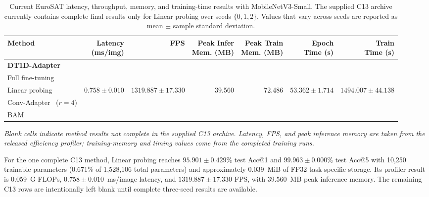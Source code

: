 \documentclass[pdflatex,sn-mathphys-num]{sn-jnl}
\theoremstyle{thmstyleone}
\theoremstyle{thmstyletwo}
\theoremstyle{thmstylethree}
\begin{document}
\begin{table}[!htbp]
\centering
\caption{Current EuroSAT latency, throughput, memory, and training-time results with MobileNetV3-Small. The supplied C13 archive currently contains complete final results only for Linear probing over seeds $\{0,1,2\}$. Values that vary across seeds are reported as mean $\pm$ sample standard deviation.}
\label{tab:eurosat_mobilenetv3_runtime}
\scriptsize
\setlength{\tabcolsep}{3pt}
\renewcommand{\arraystretch}{1.12}
\begin{tabularx}{\linewidth}{@{}Xrrrrrr@{}}
\toprule
\textbf{Method} &
\makecell{\textbf{Latency}\\\textbf{(ms/img)}} &
\textbf{FPS} &
\makecell{\textbf{Peak Infer}\\\textbf{Mem. (MB)}} &
\makecell{\textbf{Peak Train}\\\textbf{Mem. (MB)}} &
\makecell{\textbf{Epoch}\\\textbf{Time (s)}} &
\makecell{\textbf{Train}\\\textbf{Time (s)}} \\
\midrule
\textbf{DT1D-Adapter} &  &  &  &  &  & \\
Full fine-tuning &  &  &  &  &  & \\
Linear probing & $0.758\pm0.010$ & $1319.887\pm17.330$ & 39.560 & 72.486 & $53.362\pm1.714$ & $1494.007\pm44.138$ \\
Conv-Adapter~\cite{chen2024convadapter} ($r=4$) &  &  &  &  &  & \\
BAM~\cite{park2020lightweightattention} &  &  &  &  &  & \\
\bottomrule
\end{tabularx}

\vspace{2pt}
{\footnotesize\textit{Blank cells indicate method results not complete in the supplied C13 archive. Latency, FPS, and peak inference memory are taken from the released efficiency profiler; training-memory and timing values come from the completed training runs.}}
\end{table}


For the one complete C13 method, Linear probing reaches $95.901\pm0.429\%$ test Acc@1 and $99.963\pm0.000\%$ test Acc@5 with 10,250 trainable parameters (0.671\% of 1,528,106 total parameters) and approximately 0.039~MiB of FP32 task-specific storage. Its profiler result is 0.059~G FLOPs, $0.758\pm0.010$~ms/image latency, and $1319.887\pm17.330$ FPS, with 39.560~MB peak inference memory. The remaining C13 rows are intentionally left blank until complete three-seed results are available.
\end{document}
